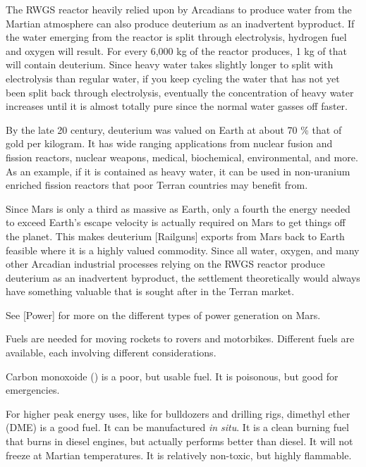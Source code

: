 The RWGS reactor heavily relied upon by Arcadians to produce water from the Martian atmosphere can also produce deuterium as an inadvertent byproduct. If the water emerging from the reactor is split through electrolysis, hydrogen fuel and oxygen will result. For every 6,000 kg of  the reactor produces, 1 kg of that will contain deuterium. Since heavy water takes slightly longer to split with electrolysis than regular water, if you keep cycling the water that has not yet been split back through electrolysis, eventually the concentration of heavy water increases until it is almost totally pure since the normal water gasses off faster.

By the late 20 century, deuterium was valued on Earth at about 70 \% that of gold per kilogram. It has wide ranging applications from nuclear fusion and fission reactors, nuclear weapons, medical, biochemical, environmental, and more. As an example, if it is contained as heavy water, it can be used in non-uranium enriched fission reactors that poor Terran countries may benefit from.

Since Mars is only a third as massive as Earth, only a fourth the energy needed to exceed Earth's escape velocity is actually required on Mars to get things off the planet. This makes deuterium [Railguns] exports from Mars back to Earth feasible where it is a highly valued commodity. Since all water, oxygen, and many other Arcadian industrial processes relying on the RWGS reactor produce deuterium as an inadvertent byproduct, the settlement theoretically would always have something valuable that is sought after in the Terran market.

See [Power] for more on the different types of power generation on Mars.

Fuels are needed for moving rockets to rovers and motorbikes. Different fuels are available, each involving different considerations.

Carbon monoxoide () is a poor, but usable fuel. It is poisonous, but good for emergencies.

For higher peak energy uses, like for bulldozers and drilling rigs, dimethyl ether  (DME) is a good fuel. It can be manufactured {\it in situ}. It is a clean burning fuel that burns in diesel engines, but actually performs better than diesel. It will not freeze at Martian temperatures. It is relatively non-toxic, but highly flammable.

